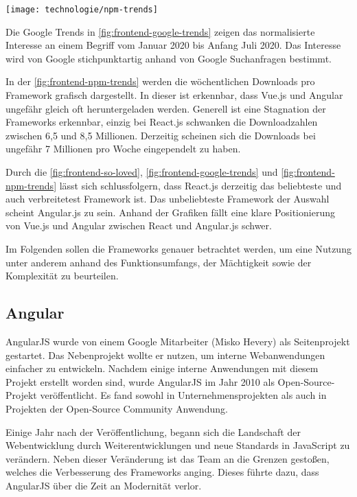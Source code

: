 \begin{center}
	\texttt{[image: technologie/npm-trends]}
	\label{fig:frontend-npm-trends}
\end{center}

Die Google Trends in \autoref{fig:frontend-google-trends} zeigen das normalisierte Interesse an einem Begriff vom Januar 2020 bis Anfang Juli 2020. Das Interesse wird von Google stichpunktartig anhand von Google Suchanfragen bestimmt. \cite{googleHaufigGestellteFragen2020}

In der \autoref{fig:frontend-npm-trends} werden die wöchentlichen Downloads pro Framework grafisch dargestellt. In dieser ist erkennbar, dass Vue.js und Angular ungefähr gleich oft heruntergeladen werden. Generell ist eine Stagnation der Frameworks erkennbar, einzig bei React.js schwanken die Downloadzahlen zwischen 6,5 und 8,5 Millionen. Derzeitig scheinen sich die Downloads bei ungefähr 7 Millionen pro Woche eingependelt zu haben.

Durch die \autoref{fig:frontend-so-loved}, \autoref{fig:frontend-google-trends} und \autoref{fig:frontend-npm-trends} lässt sich schlussfolgern, dass React.js derzeitig das beliebteste und auch verbreitetest Framework ist. Das unbeliebteste Framework der Auswahl scheint Angular.js zu sein. Anhand der Grafiken fällt eine klare Positionierung von Vue.js und Angular zwischen React und Angular.js schwer.

Im Folgenden sollen die Frameworks genauer betrachtet werden, um eine Nutzung unter anderem anhand des Funktionsumfangs, der Mächtigkeit sowie der Komplexität zu beurteilen.

\subsection{Angular}
AngularJS wurde von einem Google Mitarbeiter (Misko Hevery) als Seitenprojekt gestartet. Das Nebenprojekt wollte er nutzen, um interne Webanwendungen einfacher zu entwickeln. Nachdem einige interne Anwendungen mit diesem Projekt erstellt worden sind, wurde AngularJS im Jahr 2010 als Open-Source-Projekt veröffentlicht. Es fand sowohl in Unternehmensprojekten als auch in Projekten der Open-Source Community Anwendung.

Einige Jahr nach der Veröffentlichung, begann sich die Landschaft der Webentwicklung durch Weiterentwicklungen und neue Standards in JavaScript zu verändern. Neben dieser Veränderung ist das Team an die Grenzen gestoßen, welches die Verbesserung des Frameworks anging. Dieses führte dazu, dass AngularJS über die Zeit an Modernität verlor.

